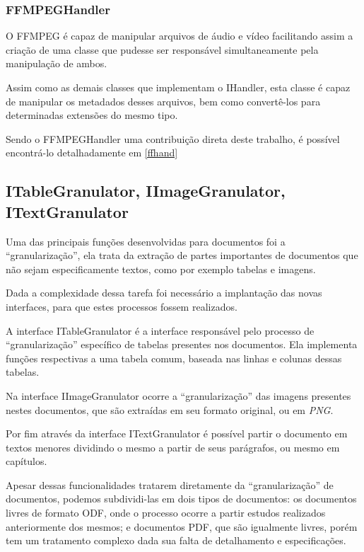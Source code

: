 \subsubsection{FFMPEGHandler}

O FFMPEG  é capaz de manipular arquivos de áudio e vídeo facilitando assim a criação de uma classe que pudesse ser responsável simultaneamente pela manipulação de ambos.

Assim como as demais classes que implementam o IHandler, esta classe é capaz de manipular os metadados desses arquivos, bem como convertê-los para determinadas extensões do mesmo tipo.

Sendo o FFMPEGHandler uma contribuição direta deste trabalho, é possível encontrá-lo detalhadamente em \ref{ffhand}


\subsection{ITableGranulator, IImageGranulator, ITextGranulator}

Uma das principais funções desenvolvidas para documentos foi a ``granularização'', ela trata da extração de partes importantes de documentos que não sejam especificamente textos, como por exemplo tabelas e imagens. 

Dada a complexidade dessa tarefa foi necessário a implantação das novas interfaces, para que estes processos fossem realizados.

A interface ITableGranulator é a interface responsável pelo processo de ``granularização'' específico de tabelas presentes nos documentos. Ela implementa funções respectivas a uma tabela comum, baseada nas linhas e colunas dessas tabelas.

Na interface IImageGranulator ocorre a ``granularização'' das imagens presentes nestes documentos, que são extraídas em seu formato original, ou em \textit{PNG}.

Por fim através da interface ITextGranulator é possível partir o documento em textos menores dividindo o mesmo a partir de seus parágrafos, ou mesmo em capítulos.

Apesar dessas funcionalidades tratarem diretamente da ``granularização'' de documentos, podemos subdividi-las em dois tipos de documentos: os documentos livres de formato ODF, onde o processo ocorre a partir estudos realizados anteriormente dos mesmos; e documentos PDF, que são igualmente livres, porém tem um tratamento complexo dada sua falta de detalhamento e especificações.


